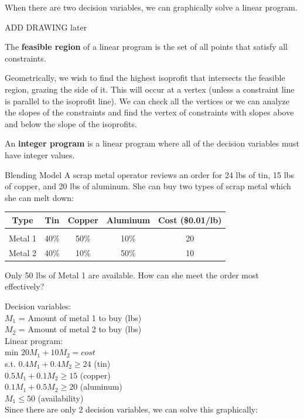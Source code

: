 \documentclass{article}
\begin{document}
\begin{remark}
    When there are two decision variables, we can graphically solve a linear program.
\end{remark}

ADD DRAWING later

\begin{definition}
    The \textbf{feasible region} of a linear program is the set of all points that
    satisfy all constraints.
\end{definition}

Geometrically, we wish to find the highest isoprofit that intersects the feasible
region, grazing the side of it. This will occur at a vertex (unless a constraint
line is parallel to the isoprofit line). We can check all the vertices or we can
analyze the slopes of the constraints and find the vertex of constraints with
slopes above and below the slope of the isoprofits. 

\begin{definition}
    An \textbf{integer program} is a linear program where all of the decision variables
    must have integer values.
\end{definition}

\begin{eg}{Blending Model}
    A scrap metal operator reviews an order for 24 lbs of tin, 15 lbs of copper, and 20 lbs of aluminum. 
    She can buy two types of scrap metal which she can melt down:
    \begin{tabular}
        { |c | c | c | c | c | }
        \hline
        Type & Tin & Copper & Aluminum & Cost (\$0.01/lb) \\
        \hline \\
        Metal 1 & 40\% & 50\% & 10\% & 20 \\
        \hline
        Metal 2 & 40\% & 10\% & 50\% & 10 \\
        \hline
    \end{tabular}
    Only 50 lbs of Metal 1 are available. How can she meet the order most effectively?
\end{eg}
\begin{answer}
    Decision variables: \\
    \(M_1\) = Amount of metal 1 to buy (lbs) \\
    \(M_2\) = Amount of metal 2 to buy (lbs)\\ 
    Linear program:\\
    min \(20M_1+10M_2=cost\)\\
    s.t. \(0.4M_1+0.4M_2\geq24\) (tin)\\
    \(0.5M_1+0.1M_2\geq15\) (copper)\\
    \(0.1M_1+0.5M_2\geq20\) (aluminum)\\
    \(M_1\leq50\) (availability)\\
    Since there are only 2 decision variables, we can solve this graphically:
\end{answer}
\end{document}
